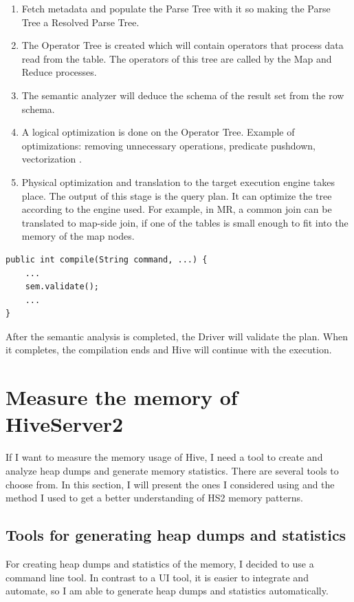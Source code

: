\begin{enumerate}
	\item Fetch metadata and populate the Parse Tree with it so making the Parse Tree a Resolved Parse Tree.
	\item The Operator Tree is created which will contain operators that process data read from the table. The operators of this tree are called by the Map and Reduce processes.
	\item The semantic analyzer will deduce the schema of the result set from the row schema.
	\item A logical optimization is done on the Operator Tree. Example of optimizations: removing unnecessary operations, predicate pushdown, vectorization \etc.
	\item Physical optimization and translation to the target execution engine takes place. The output of this stage is the query plan. It can optimize the tree according to the engine used. For example, in MR, a common join can be translated to map-side join, if one of the tables is small enough to fit into the memory of the map nodes.
\end{enumerate}

\begin{lstlisting}
public int compile(String command, ...) {
	...
	sem.validate();
	...
}
\end{lstlisting}

After the semantic analysis is completed, the Driver will validate the plan. When it completes, the compilation ends and Hive will continue with the execution.

\clearpage
\section{Measure the memory of HiveServer2}
If I want to measure the memory usage of Hive, I need a tool to create and analyze heap dumps and generate memory statistics. There are several tools to choose from. In this section, I will present the ones I considered using and the method I used to get a better understanding of HS2 memory patterns.

\subsection{Tools for generating heap dumps and statistics}
For creating heap dumps and statistics of the memory, I decided to use a command line tool. In contrast to a UI tool, it is easier to integrate and automate, so I am able to generate heap dumps and statistics automatically. 

